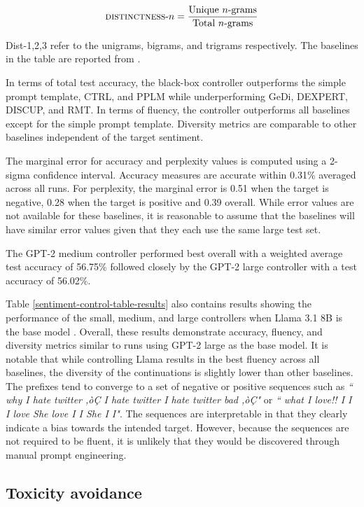 \documentclass[phd,electronic,oneside,twosidetoc,letterpaper,chaptercenter,parttop,lof]{byumsphd}
\begin{document}
\begin{equation}
    \textrm{\textsc{distinctness}-\(n\)} = \frac{\textrm{Unique \(n\)-grams}}{\textrm{Total \(n\)-grams}}
\end{equation}

\noindent Dist-1,2,3 refer to the unigrams, bigrams, and trigrams respectively.
The baselines in the table are reported from \cite{zhang2023rmt}.


In terms of total test accuracy, the black-box controller outperforms the simple prompt template, CTRL, and PPLM while underperforming GeDi, DEXPERT, DISCUP, and RMT. 
In terms of fluency, the controller outperforms all baselines except for the simple prompt template.
Diversity metrics are comparable to other baselines independent of the target sentiment.

The marginal error for accuracy and perplexity values is computed using a 2-sigma confidence interval.
Accuracy measures are accurate within 0.31\% averaged across all runs.
For perplexity, the marginal error is 0.51 when the target is negative, 0.28 when the target is positive and 0.39 overall.
While error values are not available for these baselines, it is reasonable to assume that the baselines will have similar error values given that they each use the same large test set.

The GPT-2 medium controller performed best overall with a weighted average test accuracy of 56.75\% followed closely by the GPT-2 large controller with a test accuracy of 56.02\%.

Table \ref{sentiment-control-table-results} also contains results showing the performance of the small, medium, and large controllers when Llama 3.1 8B is the base model \cite{meta2024llama3}.
Overall, these results demonstrate accuracy, fluency, and diversity metrics similar to runs using GPT-2 large as the base model.
It is notable that while controlling Llama results in the best fluency across all baselines, the diversity of the continuations is slightly lower than other baselines.
The prefixes tend to converge to a set of negative or positive sequences such as \textit{`` why I hate twitter ,òÇ I hate twitter I hate twitter bad ,òÇ"} or \textit{`` what I love!! I I I love She love I I She I I"}.
The sequences are interpretable in that they clearly indicate a bias towards the intended target.
However, because the sequences are not required to be fluent, it is unlikely that they would be discovered through manual prompt engineering.

\subsection{Toxicity avoidance}
\end{document}
